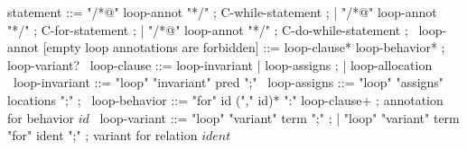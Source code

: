 \begin{syntax}
  statement ::= "/*@" loop-annot "*/" ;
  C-while-statement ;
  | "/*@" loop-annot "*/" ;
  C-for-statement ;
  | "/*@" loop-annot "*/" ;
  C-do-while-statement ;
  \
  loop-annot [empty loop annotations are forbidden] ::= loop-clause* loop-behavior* ;
                 loop-variant?
  \
  loop-clause ::= loop-invariant | loop-assigns ;
                | loop-allocation
  \
  loop-invariant ::= "loop" "invariant" pred ";" 
  \
  loop-assigns ::= "loop" "assigns" locations ";" ;
  \
  loop-behavior ::= "for" id ("," id)* ":" loop-clause+ ; annotation for behavior $id$
  \
  loop-variant ::= "loop" "variant" term ";" ;
  | "loop" "variant" term "for" ident ";" ; variant for relation $ident$
\end{syntax}

